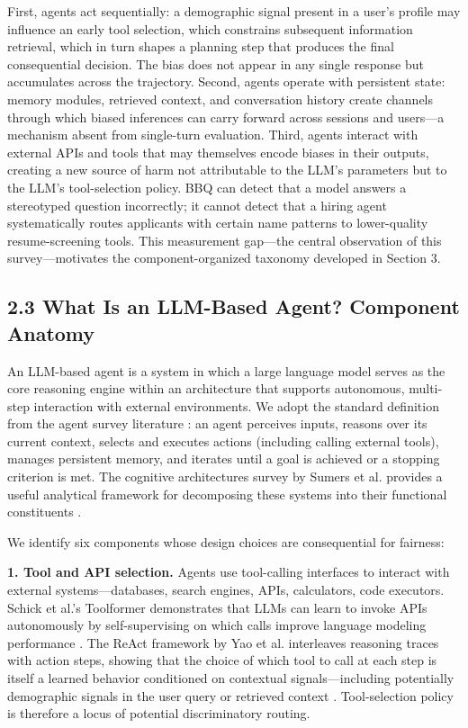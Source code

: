 \documentclass[sigconf,nonacm]{acmart}
\begin{document}
First, agents act sequentially: a demographic signal present in a user's profile may influence an early tool selection, which constrains subsequent information retrieval, which in turn shapes a planning step that produces the final consequential decision. The bias does not appear in any single response but accumulates across the trajectory. Second, agents operate with persistent state: memory modules, retrieved context, and conversation history create channels through which biased inferences can carry forward across sessions and users—a mechanism absent from single-turn evaluation. Third, agents interact with external APIs and tools that may themselves encode biases in their outputs, creating a new source of harm not attributable to the LLM's parameters but to the LLM's tool-selection policy. BBQ can detect that a model answers a stereotyped question incorrectly; it cannot detect that a hiring agent systematically routes applicants with certain name patterns to lower-quality resume-screening tools. This measurement gap—the central observation of this survey—motivates the component-organized taxonomy developed in Section 3.

\subsection{2.3 What Is an LLM-Based Agent? Component Anatomy}

An LLM-based agent is a system in which a large language model serves as the core reasoning engine within an architecture that supports autonomous, multi-step interaction with external environments. We adopt the standard definition from the agent survey literature \cite{wang2024survey,xi2023rise}: an agent perceives inputs, reasons over its current context, selects and executes actions (including calling external tools), manages persistent memory, and iterates until a goal is achieved or a stopping criterion is met. The cognitive architectures survey by Sumers et al. provides a useful analytical framework for decomposing these systems into their functional constituents \cite{sumers2024cognitive}.

We identify six components whose design choices are consequential for fairness:

\textbf{1. Tool and API selection.} Agents use tool-calling interfaces to interact with external systems—databases, search engines, APIs, calculators, code executors. Schick et al.'s Toolformer demonstrates that LLMs can learn to invoke APIs autonomously by self-supervising on which calls improve language modeling performance \cite{schick2023toolformer}. The ReAct framework by Yao et al. interleaves reasoning traces with action steps, showing that the choice of which tool to call at each step is itself a learned behavior conditioned on contextual signals—including potentially demographic signals in the user query or retrieved context \cite{yao2023react}. Tool-selection policy is therefore a locus of potential discriminatory routing.
\end{document}
